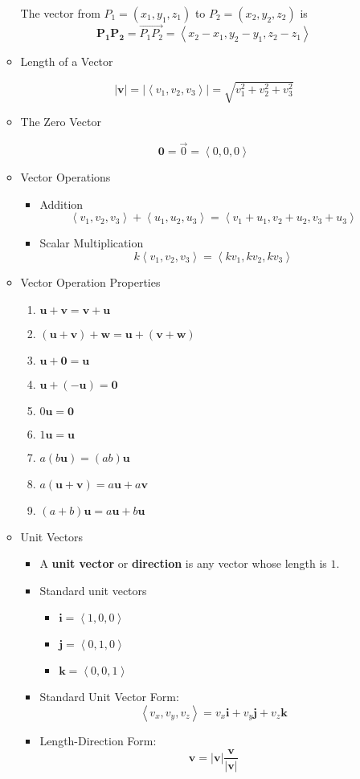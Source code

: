 \documentclass[12pt]{article}
\newcommand{\vect}[1]{\mathbf{#1}}
\newcommand{\veci}{\mathbf{i}}
\newcommand{\vecj}{\mathbf{j}}
\newcommand{\veck}{\mathbf{k}}
\newcommand{\<}{\left<}
\renewcommand{\>}{\right>}
\begin{document}
\begin{itemize}
\begin{itemize}
	The vector from $P_1 = (x_1,y_1,z_1)$ to $P_2 = (x_2,y_2,z_2)$ is \[\vect{P_1P_2} = \overrightarrow{P_1P_2} = \<x_2-x_1,y_2-y_1,z_2-z_1\>\]
	
	\item Length of a Vector
	
		\[|\vect{v}| = |\<v_1,v_2,v_3\>| = \sqrt{v_1^2 + v_2^2 + v_3^2}\]
	
	\item The Zero Vector
	
	\[\vect{0} = \overrightarrow{0} = \<0,0,0\>\]
	
	\item Vector Operations
		\begin{itemize}
		\item Addition
			\[\<v_1,v_2,v_3\> + \<u_1,u_2,u_3\> = \<v_1+u_1,v_2+u_2,v_3+u_3\>\]
		\item Scalar Multiplication
			\[k\<v_1,v_2,v_3\> = \<kv_1,kv_2,kv_3\> \]
		\end{itemize}

	\item Vector Operation Properties
		\begin{enumerate}
		\item $\vect{u}+\vect{v} = \vect{v}+\vect{u}$
		\item $(\vect{u}+\vect{v})+\vect{w} = \vect{u}+(\vect{v}+\vect{w})$
		\item $\vect{u}+\vect{0} = \vect{u}$
		\item $\vect{u}+(-\vect{u}) = \vect{0}$
		\item $0\vect{u} = \vect{0}$
		\item $1\vect{u} = \vect{u}$
		\item $a(b\vect{u}) = (ab)\vect{u}$
		\item $a(\vect{u} + \vect{v}) = a\vect{u} + a\vect{v}$
		\item $(a+b)\vect{u} = a\vect{u} + b\vect{u}$
		\end{enumerate}

	\item Unit Vectors
		\begin{itemize}
		\item A \textbf{unit vector} or \textbf{direction} is any vector whose length is $1$.
		
		\item Standard unit vectors
			\begin{itemize}
			\item $\veci = \<1,0,0\>$
			\item $\vecj = \<0,1,0\>$
			\item $\veck = \<0,0,1\>$
			\end{itemize}

		\item Standard Unit Vector Form:
			\[\<v_x,v_y,v_z\> = v_x\veci + v_y\vecj + v_z\veck\]

		\item Length-Direction Form:
			\[\vect{v} = |\vect{v}|\frac{\vect{v}}{|\vect{v}|}\]

		\end{itemize}
	\end{itemize}
\end{itemize}
\end{document}
